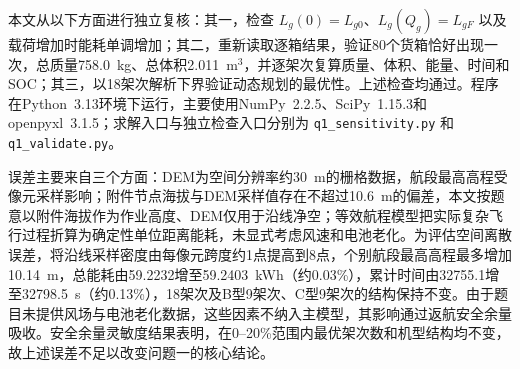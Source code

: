 本文从以下方面进行独立复核：其一，检查 $L_g(0)=L_{g0}$、$L_g(Q_g)=L_{gF}$ 以及载荷增加时能耗单调增加；其二，重新读取逐箱结果，验证80个货箱恰好出现一次，总质量758.0~kg、总体积2.011~m$^3$，并逐架次复算质量、体积、能量、时间和SOC；其三，以18架次解析下界验证动态规划的最优性。上述检查均通过。程序在Python~3.13环境下运行，主要使用NumPy~2.2.5、SciPy~1.15.3和openpyxl~3.1.5；求解入口与独立检查入口分别为 \texttt{q1\_sensitivity.py} 和 \texttt{q1\_validate.py}。

误差主要来自三个方面：DEM为空间分辨率约30~m的栅格数据，航段最高高程受像元采样影响；附件节点海拔与DEM采样值存在不超过10.6~m的偏差，本文按题意以附件海拔作为作业高度、DEM仅用于沿线净空；等效航程模型把实际复杂飞行过程折算为确定性单位距离能耗，未显式考虑风速和电池老化。为评估空间离散误差，将沿线采样密度由每像元跨度约1点提高到8点，个别航段最高高程最多增加10.14~m，总能耗由59.2232增至59.2403~kWh（约0.03\%），累计时间由32755.1增至32798.5~s（约0.13\%），18架次及B型9架次、C型9架次的结构保持不变。由于题目未提供风场与电池老化数据，这些因素不纳入主模型，其影响通过返航安全余量吸收。安全余量灵敏度结果表明，在0--20\%范围内最优架次数和机型结构均不变，故上述误差不足以改变问题一的核心结论。
